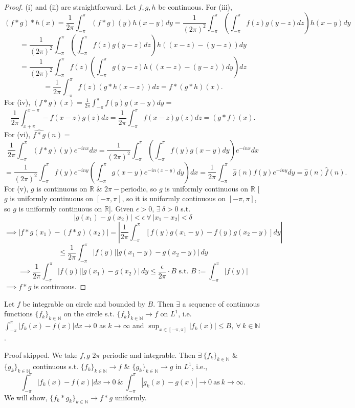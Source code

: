 \documentclass{functionspaces}
\begin{document}
\begin{proof}
(i) and (ii) are straightforward. Let $f,g,h$ be continuous. For (iii),
\[
(f*g)*h(x)=\frac{1}{2\pi}\int_{-\pi}^{\pi}(f*g)(y)h(x-y)dy=\frac{1}{(2\pi)^{2}}\int_{-\pi}^{\pi}\left(\int_{-\pi}^{\pi}f(z)g(y-z)dz\right)h(x-y)dy
\]
\[
=\frac{1}{(2\pi)^{2}}\int_{-\pi}^{\pi}\left(\int_{-\pi}^{\pi}f(z)g(y-z)dz\right)h((x-z)-(y-z))dy
\]
\[
=\frac{1}{(2\pi)^{2}}\int_{-\pi}^{\pi}f(z)\left(\int_{-\pi}^{\pi}g(y-z)h((x-z)-(y-z))dy\right)dz
\]
\[
=\frac{1}{2\pi}\int_{-\pi}^{\pi}f(z)(g*h(x-z))dz=f*(g*h)(x).
\]
For (iv), $(f*g)(x)=\frac{1}{2\pi}\int_{-\pi}^{\pi}f(y)g(x-y)dy=$
\[
\frac{1}{2\pi}\int_{x+\pi}^{x-\pi}-f(x-z)g(z)dz=\frac{1}{2\pi}\int_{-\pi}^{\pi}f(x-z)g(z)dz=(g*f)(x).
\]
For (vi), $\widehat{f*g}(n)=$
\[
\frac{1}{2\pi}\int_{-\pi}^{\pi}(f*g)(y)e^{-inx}dx=\frac{1}{(2\pi)^{2}}\int_{-\pi}^{\pi}\left(\int_{-\pi}^{\pi}f(y)g(x-y)dy\right)e^{-inx}dx
\]
\[
=\frac{1}{(2\pi)^{2}}\int_{-\pi}^{\pi}f(y)e^{-iny}\left(\int_{-\pi}^{\pi}g(x-y)e^{-in(x-y)}dy\right)dx=\frac{1}{2\pi}\int_{-\pi}^{\pi}\hat{g}(n)f(y)e^{-iny}dy=\hat{g}(n)\hat{f}(n).
\]
For (v), $g$ is continuous on $\mathbb{R}$ \& $2\pi-$periodic, so $g$ is uniformly continuous on $\mathbb{R}$ [$g$ is uniformly continuous on $[-\pi,\pi]$, so it is uniformly continuous on $[-\pi,\pi]$, so $g$ is uniformly continuous on $\mathbb{R}$]. Given $\epsilon>0$, $\exists\ \delta>0$ s.t.
\[
|g(x_{1})-g(x_{2})|<\epsilon\ \forall\ |x_{1}-x_{2}|<\delta
\]
\[
\implies|f*g(x_{1})-(f*g)(x_{2})|=\left|\frac{1}{2\pi}\int_{-\pi}^{\pi}[f(y)g(x_{1}-y)-f(y)g(x_{2}-y)]dy\right|
\]
\[
\leq\frac{1}{2\pi}\int_{-\pi}^{\pi}\left|f(y)\right||g(x_{1}-y)-g(x_{2}-y)|\,dy
\]
\[
\implies\frac{1}{2\pi}\int_{-\pi}^{\pi}\left|f(y)\right||g(x_{1})-g(x_{2})|\,dy\leq\frac{\epsilon}{2\pi}\cdot B\text{ s.t. }B:=\int_{-\pi}^{\pi}\left|f(y)\right|
\]
$\implies f*g$ is continuous.
\end{proof}

\begin{lemma}\label{lem:approx_continuous}
Let $f$ be integrable on circle and bounded by $B$. Then $\exists$ a sequence of continuous functions $\{f_{k}\}_{k\in\mathbb{N}}$ on the circle s.t. $\{f_{k}\}_{k\in\mathbb{N}}\to f$ on $L^{1}$, i.e. $\int_{-\pi}^{\pi}|f_{k}(x)-f(x)|dx\to 0$ as $k\to\infty$ and $\sup_{x\in[-\pi,\pi]}|f_{k}(x)|\leq B,\ \forall\ k\in\mathbb{N}$.
\end{lemma}

Proof skipped. We take $f,g$ $2\pi$ periodic and integrable. Then $\exists\ \{f_{k}\}_{k\in\mathbb{N}}$ \& $\{g_{k}\}_{k\in\mathbb{N}}$ continuous s.t. $\{f_{k}\}_{k\in\mathbb{N}}\to f$ \& $\{g_{k}\}_{k\in\mathbb{N}}\to g$ in $L^{1}$, i.e.,
\[
\int_{-\pi}^{\pi}|f_{k}(x)-f(x)|dx\to 0\ \&\ \int_{-\pi}^{\pi}|g_{k}(x)-g(x)|\to 0\ \text{as}\ k\to\infty.
\]
We will show, $\{f_{k}*g_{k}\}_{k\in\mathbb{N}}\to f*g$ uniformly.
\end{document}
